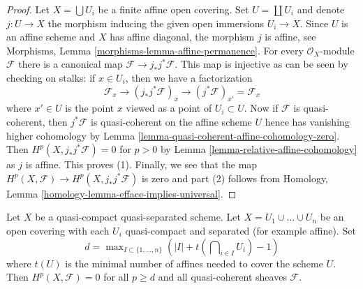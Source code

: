 \begin{proof}
Let $X = \bigcup U_i$ be a finite affine open covering.
Set $U = \coprod U_i$ and denote $j : U \to X$
the morphism inducing the given open immersions $U_i \to X$.
Since $U$ is an affine scheme and $X$ has affine diagonal,
the morphism $j$ is affine, see
Morphisms, Lemma \ref{morphisms-lemma-affine-permanence}.
For every $\mathcal{O}_X$-module $\mathcal{F}$ there is
a canonical map $\mathcal{F} \to j_*j^*\mathcal{F}$.
This map is injective as can be seen by checking on stalks:
if $x \in U_i$, then we have a factorization
$$
\mathcal{F}_x \to (j_*j^*\mathcal{F})_x
\to (j^*\mathcal{F})_{x'} = \mathcal{F}_x
$$
where $x' \in U$ is the point $x$ viewed as a point of $U_i \subset U$.
Now if $\mathcal{F}$ is quasi-coherent, then $j^*\mathcal{F}$
is quasi-coherent on the affine scheme $U$ hence has vanishing
higher cohomology by
Lemma \ref{lemma-quasi-coherent-affine-cohomology-zero}.
Then $H^p(X, j_*j^*\mathcal{F}) = 0$ for
$p > 0$ by Lemma \ref{lemma-relative-affine-cohomology}
as $j$ is affine. This proves (1).
Finally, we see that the map
$H^p(X, \mathcal{F}) \to H^p(X, j_*j^*\mathcal{F})$
is zero and part (2) follows from
Homology, Lemma \ref{homology-lemma-efface-implies-universal}.
\end{proof}

\begin{lemma}
\label{lemma-vanishing-nr-affines-quasi-separated}
Let $X$ be a quasi-compact quasi-separated scheme.
Let $X = U_1 \cup \ldots \cup U_n$ be an open covering
with each $U_i$ quasi-compact and separated (for example affine).
Set
$$
d = \max\nolimits_{I \subset \{1, \ldots, n\}}
\left(|I| + t(\bigcap\nolimits_{i \in I} U_i) - 1\right)
$$
where $t(U)$ is the minimal number of affines needed to cover
the scheme $U$. Then $H^p(X, \mathcal{F}) = 0$ for all $p \geq d$ and all
quasi-coherent sheaves $\mathcal{F}$.
\end{lemma}

